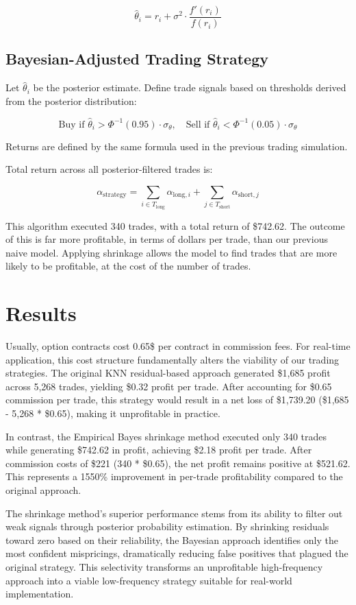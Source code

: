 \documentclass{article}
\begin{document}
\[
\hat{\theta}_i = r_i + \sigma^2 \cdot \frac{f'(r_i)}{f(r_i)}
\]

\subsection{Bayesian-Adjusted Trading Strategy}

Let \( \hat{\theta}_i \) be the posterior estimate. Define trade signals based on thresholds derived from the posterior distribution:

\[
\text{Buy if } \hat{\theta}_i > \Phi^{-1}(0.95) \cdot \sigma_\theta, \quad
\text{Sell if } \hat{\theta}_i < \Phi^{-1}(0.05) \cdot \sigma_\theta
\]

Returns are defined by the same formula used in the previous trading simulation.

Total return across all posterior-filtered trades is:

\[
\alpha_{\text{strategy}} = \sum_{i \in T_{\text{long}}} \alpha_{\text{long}, i} + \sum_{j \in T_{\text{short}}} \alpha_{\text{short}, j}
\]

This algorithm executed 340 trades, with a total return of \$742.62. The outcome of this is far more profitable, in terms of dollars per trade, than our previous naive model. Applying shrinkage allows the model to find trades that are more likely to be profitable, at the cost of the number of trades.

\section{Results}

Usually, option contracts cost 0.65\$ per contract in commission fees. For real-time application, this cost structure fundamentally alters the viability of our trading strategies. The original KNN residual-based approach generated \$1,685 profit across 5,268 trades, yielding \$0.32 profit per trade. After accounting for \$0.65 commission per trade, this strategy would result in a net loss of \$1,739.20 (\$1,685 - 5,268 * \$0.65), making it unprofitable in practice.

In contrast, the Empirical Bayes shrinkage method executed only 340 trades while generating \$742.62 in profit, achieving \$2.18 profit per trade. After commission costs of \$221 (340 * \$0.65), the net profit remains positive at \$521.62. This represents a 1550\% improvement in per-trade profitability compared to the original approach.

The shrinkage method's superior performance stems from its ability to filter out weak signals through posterior probability estimation. By shrinking residuals toward zero based on their reliability, the Bayesian approach identifies only the most confident mispricings, dramatically reducing false positives that plagued the original strategy. This selectivity transforms an unprofitable high-frequency approach into a viable low-frequency strategy suitable for real-world implementation. 
\end{document}
